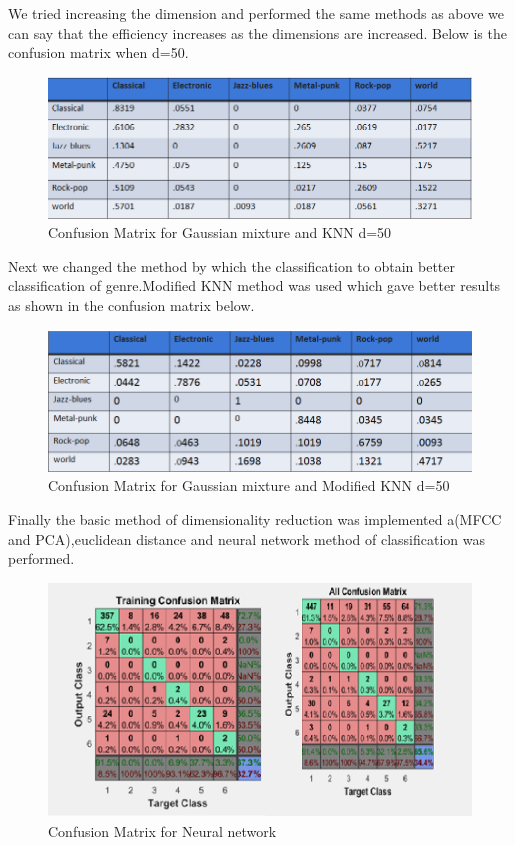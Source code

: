 \documentclass[12pt]{article}
\begin{document}
We tried increasing the dimension and performed the same methods as above we can say that the efficiency increases as the dimensions are increased. Below is the confusion matrix when d=50.
\begin{figure}[H]
\center
\includegraphics [scale=0.7]{result3.png}
\caption{Confusion Matrix for Gaussian mixture and KNN d=50 }
\end{figure}
Next we changed the method by which the classification to obtain better classification of genre.Modified KNN method was used which gave better results as shown in the confusion matrix below.
\begin{figure}[H]
\center
\includegraphics [scale=0.7]{result4.png}
\caption{Confusion Matrix for Gaussian mixture and Modified KNN d=50 }
\end{figure}
Finally the basic method of dimensionality reduction was implemented a(MFCC and PCA),euclidean distance and neural network method of classification was performed.
\begin{figure}[H]
\center
\includegraphics [scale=0.7]{result5.png}
\caption{Confusion Matrix for Neural network }
\end{figure}
\end{document}
